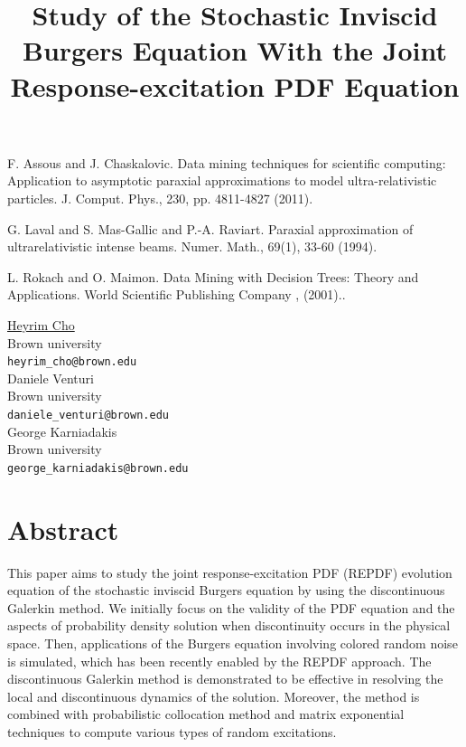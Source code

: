 \documentclass[article,A4,11pt]{llncs}%
\begin{document}

\begin{thebibliography}{10}
{\sc F. Assous and J. Chaskalovic}. {Data mining techniques for scientific computing: Application to asymptotic paraxial approximations to model ultra-relativistic particles}. J. Comput. Phys., 230, pp. 4811-4827 (2011).

{\sc G. Laval and S. Mas-Gallic and P.-A. Raviart}. {Paraxial approximation of ultrarelativistic intense beams}. Numer. Math., 69(1), 33-60 (1994).

{\sc L. Rokach and O. Maimon}. {Data Mining with Decision Trees: Theory and Applications}. World Scientific Publishing Company , (2001)..
\end{thebibliography}

\title{Study of the Stochastic Inviscid Burgers Equation With the Joint Response-excitation PDF Equation}
 \author{} \institute{}
\maketitle
\begin{center}
{\large \underline{Heyrim Cho}}\\
Brown university\\
{\tt heyrim\_cho@brown.edu}
\\ \vspace{4mm}
{\large Daniele Venturi}\\
Brown university\\
{\tt daniele\_venturi@brown.edu}
\\ \vspace{4mm}
{\large George Karniadakis}\\
Brown university\\
{\tt george\_karniadakis@brown.edu}
\end{center}

\section*{Abstract}
This paper aims to study the joint response-excitation PDF (REPDF) evolution equation of the stochastic inviscid Burgers equation by using the discontinuous Galerkin method. We initially focus on the validity of the PDF equation and the aspects of probability density solution when discontinuity occurs in the physical space. Then, applications of the Burgers equation involving colored random noise is simulated, which has been recently enabled by the REPDF approach. The discontinuous Galerkin method is demonstrated to be effective in resolving the local and discontinuous dynamics of the solution. Moreover, the method is combined with probabilistic collocation method and matrix exponential techniques to compute various types of random excitations. 
\end{document}
